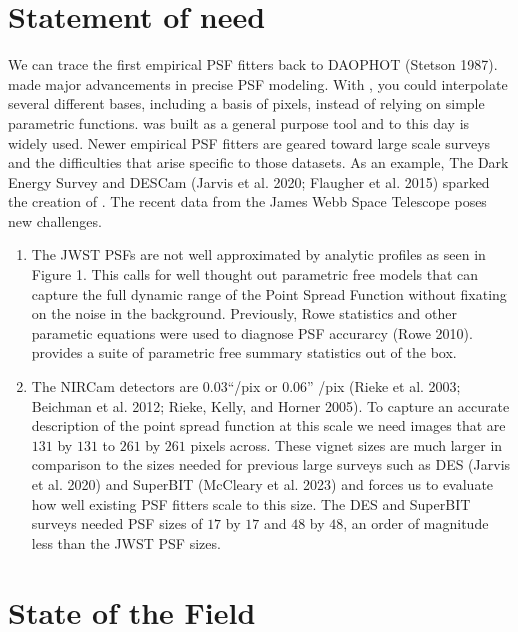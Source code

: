 \documentclass[10pt,a4paper,onecolumn]{article}
\let\textttOrig=\texttt
\def\texttt#1{\expandafter\textttOrig{\seqsplit{#1}}}
\begin{document}
\hypertarget{statement-of-need}{%
\section{Statement of need}\label{statement-of-need}}

We can trace the first empirical PSF fitters back to DAOPHOT (Stetson
1987). \texttt{PSFex} made major advancements in precise PSF modeling.
With \texttt{PSFex}, you could interpolate several different bases,
including a basis of pixels, instead of relying on simple parametric
functions. \texttt{PSFex} was built as a general purpose tool and to
this day is widely used. Newer empirical PSF fitters are geared toward
large scale surveys and the difficulties that arise specific to those
datasets. As an example, The Dark Energy Survey and DESCam (Jarvis et
al. 2020; Flaugher et al. 2015) sparked the creation of \texttt{PIFF}.
The recent data from the James Webb Space Telescope poses new
challenges.

\begin{enumerate}
\def\labelenumi{(\arabic{enumi})}
\item
  The JWST PSFs are not well approximated by analytic profiles as seen
  in Figure 1. This calls for well thought out parametric free models
  that can capture the full dynamic range of the Point Spread Function
  without fixating on the noise in the background. Previously, Rowe
  statistics and other parametic equations were used to diagnose PSF
  accurarcy (Rowe 2010). \texttt{ShOpt} provides a suite of parametric
  free summary statistics out of the box.
\item
  The NIRCam detectors are 0.03``/pix or 0.06'' /pix (Rieke et al. 2003;
  Beichman et al. 2012; Rieke, Kelly, and Horner 2005). To capture an
  accurate description of the point spread function at this scale we
  need images that are \(131\) by \(131\) to \(261\) by \(261\) pixels
  across. These vignet sizes are much larger in comparison to the sizes
  needed for previous large surveys such as DES (Jarvis et al. 2020) and
  SuperBIT (McCleary et al. 2023) and forces us to evaluate how well
  existing PSF fitters scale to this size. The DES and SuperBIT surveys
  needed PSF sizes of \(17\) by \(17\) and \(48\) by \(48\), an order of
  magnitude less than the JWST PSF sizes.
\end{enumerate}

\hypertarget{state-of-the-field}{%
\section{State of the Field}\label{state-of-the-field}}
\end{document}
